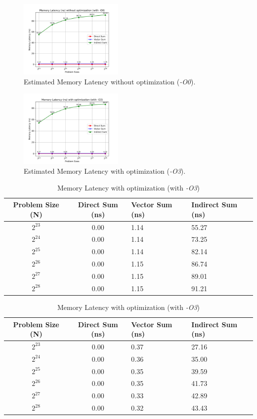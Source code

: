 \begin{figure}[htbp]
    \centering
    \includegraphics[width=0.45\textwidth]{Latency_O0.png}
    \caption{Estimated Memory Latency without optimization (\textit{-O0}).}
    \label{fig:Latency_O0}
\end{figure}

\begin{figure}[htbp]
    \centering
    \includegraphics[width=0.45\textwidth]{Latency_O3.png}
    \caption{Estimated Memory Latency with optimization (\textit{-O3}).}
    \label{fig:Latency_O3}
\end{figure}

\begin{table}[htbp]
    \centering\small
    \begin{tabular}{c|cll}
 Problem Size (N) & Direct Sum (ns)& Vector Sum (ns)& Indirect Sum (ns)\\ \hline
 $2^{23}$ & 0.00& 1.14&55.27\\
 $2^{24}$ & 0.00& 1.14&73.25\\
 $2^{25}$ & 0.00& 1.14&82.14\\
 $2^{26}$ & 0.00& 1.15&86.74\\
 $2^{27}$ & 0.00& 1.15&89.01\\
 $2^{28}$ & 0.00& 1.15&91.21\\ 
    \end{tabular}
    \caption{Memory Latency without optimization (with \textit{-O0})}
    \label{tab:memory-latency-o0}
    \begin{tabular}{c|cll}
 Problem Size (N) & Direct Sum (ns)& Vector Sum (ns)& Indirect Sum (ns)\\ \hline
 $2^{23}$ & 0.00& 0.37&27.16\\
 $2^{24}$ & 0.00& 0.36&35.00\\
 $2^{25}$ & 0.00& 0.35&39.59\\
 $2^{26}$ & 0.00& 0.35&41.73\\
 $2^{27}$ & 0.00& 0.33&42.89\\
 $2^{28}$ & 0.00& 0.32&43.43\\ 
    \end{tabular}
    \caption{Memory Latency with optimization (with \textit{-O3})}
    \label{tab:memory-latency-o3}
\end{table}

